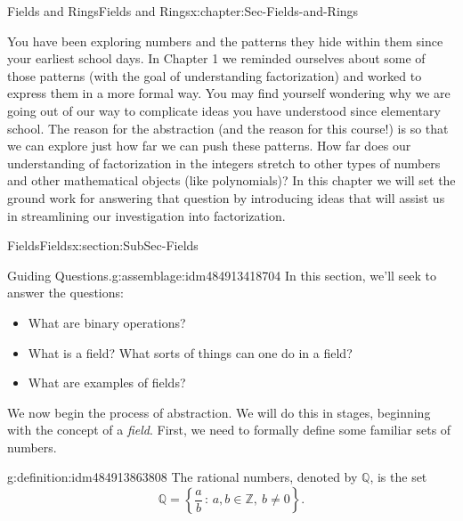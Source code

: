 \documentclass[oneside,10pt,]{book}
\numberwithin{equation}{section}
\newcommand{\setof}[2]{{\left\{#1\,\colon\,#2\right\}}}
\def\Z{{\mathbb Z}}
\def\Q{{\mathbb Q}}
\begin{document}
%
%
\typeout{************************************************}
\typeout{************************************************}
%
\begin{chapterptx}{Fields and Rings}{}{Fields and Rings}{}{}{x:chapter:Sec-Fields-and-Rings}
\begin{introduction}{}%
You have been exploring numbers and the patterns they hide within them since your earliest school days. In Chapter 1 we reminded ourselves about some of those patterns (with the goal of understanding factorization) and worked to express them in a more formal way. You may find yourself wondering why we are going out of our way to complicate ideas you have understood since elementary school. The reason for the abstraction (and the reason for this course!) is so that we can explore just how far we can push these patterns. How far does our understanding of factorization in the integers stretch to other types of numbers and other mathematical objects (like polynomials)? In this chapter we will set the ground work for answering that question by introducing ideas that will assist us in streamlining our investigation into factorization.%
\end{introduction}%
%
%
\typeout{************************************************}
\typeout{************************************************}
%
\begin{sectionptx}{Fields}{}{Fields}{}{}{x:section:SubSec-Fields}
\begin{assemblage}{Guiding Questions.}{g:assemblage:idm484913418704}%
In this section, we'll seek to answer the questions: %
\begin{itemize}[label=\textbullet]
\item{}What are binary operations?%
\item{}What is a field? What sorts of things can one do in a field?%
\item{}What are examples of fields?%
\end{itemize}
%
\end{assemblage}
We now begin the process of abstraction. We will do this in stages, beginning with the concept of a \emph{field}. First, we need to formally define some familiar sets of numbers.%
\begin{definition}{}{g:definition:idm484913863808}%
The rational numbers, denoted by \(\Q\), is the set%
\begin{equation*}
\Q = \setof{\frac{a}{b}}{a,b\in \Z, \ b\ne 0}\text{.}
\end{equation*}

\end{definition}
\end{sectionptx}
\end{chapterptx}
\end{document}
